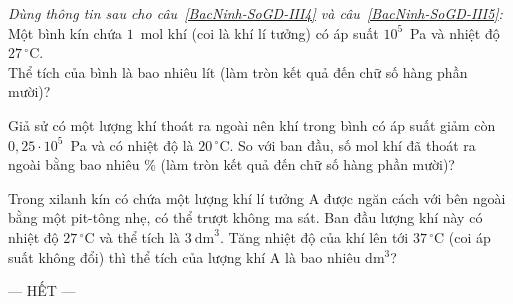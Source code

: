 	\begin{ex}%
		\label{BacNinh-SoGD-III4}
		\textit{Dùng thông tin sau cho câu~\ref{BacNinh-SoGD-III4} và câu~\ref{BacNinh-SoGD-III5}:} Một bình kín chứa $1$~mol khí (coi là khí lí tưởng) có áp suất $10^5$~Pa và nhiệt độ $27\,^\circ\text{C}$.\\
		Thể tích của bình là bao nhiêu lít (làm tròn kết quả đến chữ số hàng phần mười)?
		\par
	\end{ex}

	\begin{ex}%
		\label{BacNinh-SoGD-III5}
		Giả sử có một lượng khí thoát ra ngoài nên khí trong bình có áp suất giảm còn $0{,}25\cdot 10^5$~Pa và có nhiệt độ là $20\,^\circ\text{C}$. So với ban đầu, số mol khí đã thoát ra ngoài bằng bao nhiêu \% (làm tròn kết quả đến chữ số hàng phần mười)?
		\par
	\end{ex}

	\begin{ex}%
		Trong xilanh kín có chứa một lượng khí lí tưởng A được ngăn cách với bên ngoài bằng một pit-tông nhẹ, có thể trượt không ma sát. Ban đầu lượng khí này có nhiệt độ $27\,^\circ\text{C}$ và thể tích là $3~\text{dm}^3$. Tăng nhiệt độ của khí lên tới $37\,^\circ\text{C}$ (coi áp suất không đổi) thì thể tích của lượng khí A là bao nhiêu dm$^3$?
		\par
	\end{ex}

	\centerline{--- HẾT ---}


